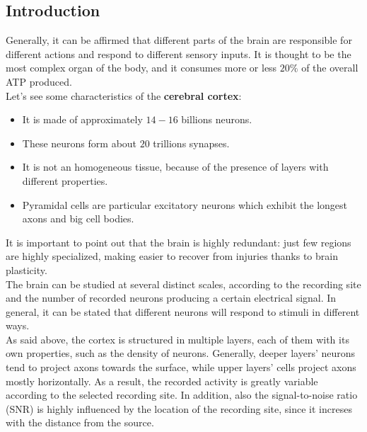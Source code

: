 \subsection{Introduction}
Generally, it can be affirmed that different parts of the brain are responsible
for different actions and respond to different sensory inputs. It is
thought to be the most complex organ of the body, and it consumes more or less
\(20\%\) of the overall ATP produced.\\
Let's see some characteristics of the \textbf{cerebral cortex}:
\begin{itemize}
    \item It is made of approximately \(14-16\) billions neurons.
    \item These neurons form about \(20\) trillions synapses.
    \item It is not an homogeneous tissue, because of the presence of layers with 
    different properties.
    \item Pyramidal cells are particular excitatory neurons which exhibit the longest 
    axons and big cell bodies.
\end{itemize}

It is important to point out that the brain is highly redundant:
just few regions are highly specialized, making easier to recover from injuries
thanks to brain plasticity.\\
The brain can be studied at several distinct scales, according to the recording site
and the number of recorded neurons producing a certain electrical signal. In general,
it can be stated that different neurons will respond to stimuli in different ways.\\
As said above, the cortex is structured in multiple layers, each of them with its own
properties, such as the density of neurons. Generally, deeper layers' neurons
tend to project axons towards the surface, while upper layers' cells project axons
mostly horizontally. As a result, the recorded activity is greatly variable according
to the selected recording site. In addition, also the signal-to-noise ratio (SNR) is 
highly influenced by the location of the recording site, since it increses with the 
distance from the source.

